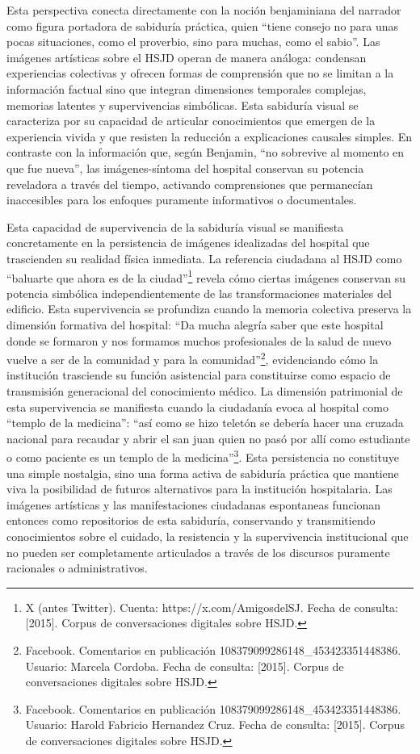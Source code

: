 Esta perspectiva conecta directamente con la noción benjaminiana del narrador como figura portadora de sabiduría práctica, quien ``tiene consejo no para unas pocas situaciones, como el proverbio, sino para muchas, como el sabio''. Las imágenes artísticas sobre el HSJD operan de manera análoga: condensan experiencias colectivas y ofrecen formas de comprensión que no se limitan a la información factual sino que integran dimensiones temporales complejas, memorias latentes y supervivencias simbólicas. Esta sabiduría visual se caracteriza por su capacidad de articular conocimientos que emergen de la experiencia vivida y que resisten la reducción a explicaciones causales simples. En contraste con la información que, según Benjamin, ``no sobrevive al momento en que fue nueva'', las imágenes-síntoma del hospital conservan su potencia reveladora a través del tiempo, activando comprensiones que permanecían inaccesibles para los enfoques puramente informativos o documentales.

Esta capacidad de supervivencia de la sabiduría visual se manifiesta concretamente en la persistencia de imágenes idealizadas del hospital que trascienden su realidad física inmediata. La referencia ciudadana al HSJD como ``baluarte que ahora es de la ciudad''\footnote{X (antes Twitter). Cuenta: https://x.com/AmigosdelSJ. Fecha de consulta: [2015]. Corpus de conversaciones digitales sobre HSJD.} revela cómo ciertas imágenes conservan su potencia simbólica independientemente de las transformaciones materiales del edificio. Esta supervivencia se profundiza cuando la memoria colectiva preserva la dimensión formativa del hospital: ``Da mucha alegría saber que este hospital donde se formaron y nos formamos muchos profesionales de la salud de nuevo vuelve a ser de la comunidad y para la comunidad''\footnote{Facebook. Comentarios en publicación 108379099286148\_453423351448386. Usuario: Marcela Cordoba. Fecha de consulta: [2015]. Corpus de conversaciones digitales sobre HSJD.}, evidenciando cómo la institución trasciende su función asistencial para constituirse como espacio de transmisión generacional del conocimiento médico. La dimensión patrimonial de esta supervivencia se manifiesta cuando la ciudadanía evoca al hospital como ``templo de la medicina'': ``así como se hizo teletón se debería hacer una cruzada nacional para recaudar y abrir el san juan quien no pasó por allí como estudiante o como paciente es un templo de la medicina''\footnote{Facebook. Comentarios en publicación 108379099286148\_453423351448386. Usuario: Harold Fabricio Hernandez Cruz. Fecha de consulta: [2015]. Corpus de conversaciones digitales sobre HSJD.}. Esta persistencia no constituye una simple nostalgia, sino una forma activa de sabiduría práctica que mantiene viva la posibilidad de futuros alternativos para la institución hospitalaria. Las imágenes artísticas y las manifestaciones ciudadanas espontaneas funcionan entonces como repositorios de esta sabiduría, conservando y transmitiendo conocimientos sobre el cuidado, la resistencia y la supervivencia institucional que no pueden ser completamente articulados a través de los discursos puramente racionales o administrativos.

